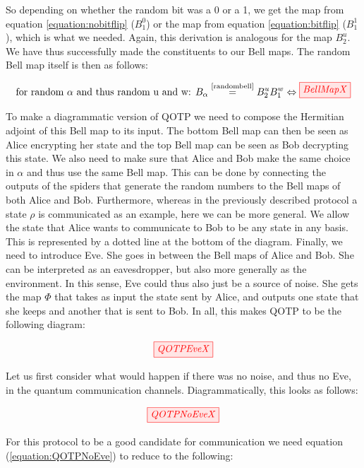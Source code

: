 \documentclass[]{article}
\newcommand{\equaltext}[1]{\ensuremath{\stackrel{\text{#1}}{=}}}
\begin{document}
So depending on whether the random bit was a 0 or a 1, we get the map from equation \ref{equation:nobitflip} ($B_1^0$) or the map from equation \ref{equation:bitflip} ($B_1^1$), which is what we needed. Again, this derivation is analogous for the map $B_2^u$. We have thus successfully made the constituents to our Bell maps. The random Bell map itself is then as follows:

\begin{equation}
	\label{equation:BellMap}
	\text{for random $\alpha$ and thus random u and w: }
	B_\alpha \equaltext{\ref{randombell}} B_2^uB_1^w \Leftrightarrow \tikzfig{BellMapX}
\end{equation}

To make a diagrammatic version of QOTP we need to compose the Hermitian adjoint of this Bell map to its input. The bottom Bell map can then be seen as Alice encrypting her state and the top Bell map can be seen as Bob decrypting this state. We also need to make sure that Alice and Bob make the same choice in $\alpha$ and thus use the same Bell map. This can be done by connecting the outputs of the spiders that generate the random numbers to the Bell maps of both Alice and Bob. Furthermore, whereas in the previously described protocol a state $\rho$ is communicated as an example, here we can be more general. We allow the state that Alice wants to communicate to Bob to be any state in any basis. This is represented by a dotted line at the bottom of the diagram. Finally, we need to introduce Eve. She goes in between the Bell maps of Alice and Bob. She can be interpreted as an eavesdropper, but also more generally as the environment. In this sense, Eve could thus also just be a source of noise. She gets the map $\Phi$ that takes as input the state sent by Alice, and outputs one state that she keeps and another that is sent to Bob. In all, this makes QOTP to be the following diagram:

\begin{equation}
\tikzfig{QOTPEveX}
\label{equation:QOTPEve}
\end{equation}

Let us first consider what would happen if there was no noise, and thus no Eve, in the quantum communication channels. Diagrammatically, this looks as follows:

\begin{equation}
	\tikzfig{QOTPNoEveX}
	\label{equation:QOTPNoEve}
\end{equation}

For this protocol to be a good candidate for communication we need equation (\ref{equation:QOTPNoEve}) to reduce to the following: 
\end{document}
